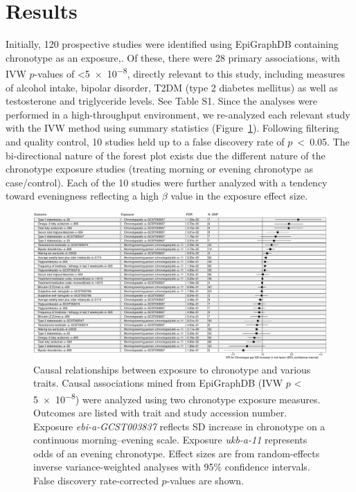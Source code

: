 \documentclass[genes,article,accept,moreauthors,pdftex]{Definitions/mdpi}
\begin{document}
\section{Results}
Initially, 120 prospective studies were identified using EpiGraphDB containing chronotype as an exposure,. Of these, there were 28 primary associations, with IVW $p$-values of <\num{5e-8}, directly relevant to this study, including measures of alcohol intake, bipolar disorder, T2DM (type 2 diabetes mellitus) as well as testosterone and triglyceride levels. See {Table S1}. Since the analyses were performed in a high-throughput environment, we re-analyzed each relevant study with the IVW method using summary statistics (\mbox{Figure~\ref{forestIVW}}). Following filtering and quality control, 10 studies held up to a false discovery rate of \mbox{$p$ < 0.05}. The bi-directional nature of the forest plot exists due the different nature of the chronotype exposure studies (treating morning or evening chronotype as case/control). Each of the 10 studies were further analyzed with a tendency toward eveningness reflecting a high $\beta$ value in the exposure effect size. 
\begin{figure}[H]
	\includegraphics[width=0.95\linewidth]{Figs/Analysis1/new_forestIVW1a.pdf}
	\caption{Causal relationships between exposure to chronotype and various traits. Causal associations mined from EpiGraphDB (IVW $p$ < \num{5e-8}) were analyzed using two chronotype exposure measures. Outcomes are listed with trait and study accession number. Exposure \textit{ebi-a-GCST003837} reflects SD increase in chronotype on a continuous morning--evening scale. Exposure \textit{ukb-a-11} represents odds of an evening chronotype. Effect sizes are from {random}-effects inverse variance-weighted analyses with 95\% confidence intervals. False discovery rate-corrected $p$-values are shown.}
	\label{forestIVW}
\end{figure}
\end{document}
